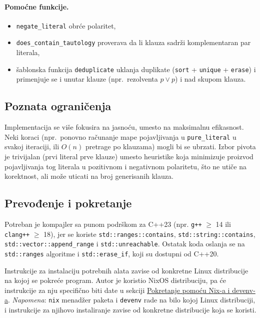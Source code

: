 \documentclass[a4paper,10pt]{article}
\begin{document}
\paragraph{Pomoćne funkcije.}
\begin{itemize}
  \item \verb|negate_literal| obrće polaritet,
  \item \verb|does_contain_tautology| proverava da li klauza sadrži komplementaran par literala,
  \item šablonska funkcija \verb|deduplicate| uklanja duplikate (\verb|sort| + \verb|unique| + \verb|erase|) i primenjuje se i unutar klauze (npr.\ rezolventa $p \vee p$) i nad skupom klauza.
\end{itemize}

\subsection{Poznata ograničenja}

Implementacija se više fokusira na jasnoću, umesto na maksimalnu efikasnost. Neki koraci (npr.\ ponovno računanje mape pojavljivanja u \verb|pure_literal| u svakoj iteraciji, ili $O(n)$ pretrage po klauzama) mogli bi se ubrzati. Izbor pivota je trivijalan (prvi literal prve klauze) umesto heuristike koja minimizuje proizvod pojavljivanja tog literala u pozitivnom i negativnom polaritetu, što ne utiče na korektnost, ali može uticati na broj generisanih klauza.

\subsection{Prevođenje i pokretanje}

Potreban je kompajler sa punom podrškom za C++23 (npr. \verb|g++| $\ge$ 14 ili \verb|clang++| $\ge$ 18), jer se koriste \verb|std::ranges::contains|, \verb|std::string::contains|, \verb|std::vector::append_range| i \verb|std::unreachable|. Ostatak koda oslanja se na \verb|std::ranges| algoritme i \verb|std::erase_if|, koji su dostupni od C++20.


Instrukcije za instalaciju potrebnih alata zavise od konkretne Linux distribucije na kojoj se pokreće program.
Autor je koristio NixOS distribuciju, pa će instrukcije za nju specifično biti date u sekciji \hyperref[subsec:nix]{Pokretanje pomoću Nix-a i devenv-a}.
\emph{Napomena}: \verb|nix| menadžer paketa i \verb|devenv| rade na bilo kojoj Linux distribuciji, i instrukcije za njihovo instaliranje zavise od konkretne distribucije koja se koristi.
\end{document}
